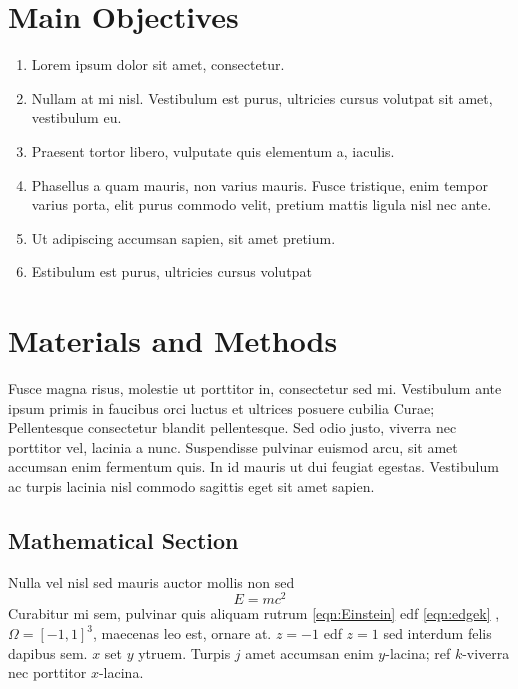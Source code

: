 \documentclass[12pt,a4paper]{article}\def\nCols{1}
\begin{document}
\section{Main Objectives}

\begin{enumerate}
\item Lorem ipsum dolor sit amet, consectetur.
\item Nullam at mi nisl. Vestibulum est purus, ultricies cursus volutpat sit amet, vestibulum eu.
\item Praesent tortor libero, vulputate quis elementum a, iaculis.
\item Phasellus a quam mauris, non varius mauris. Fusce tristique, enim tempor varius porta, elit purus commodo velit, pretium mattis ligula nisl nec ante.
\item Ut adipiscing accumsan sapien, sit amet pretium.
\item Estibulum est purus, ultricies cursus volutpat
\end{enumerate}








\section{Materials and Methods}

Fusce magna risus, molestie ut porttitor in, consectetur sed mi. Vestibulum ante ipsum primis in faucibus orci luctus et ultrices posuere cubilia Curae; Pellentesque consectetur blandit pellentesque. Sed odio justo, viverra nec porttitor vel, lacinia a nunc. Suspendisse pulvinar euismod arcu, sit amet accumsan enim fermentum quis. In id mauris ut dui feugiat egestas. Vestibulum ac turpis lacinia nisl commodo sagittis eget sit amet sapien.




\subsection{Mathematical Section}

Nulla vel nisl sed mauris auctor mollis non sed \cite{Smith:2012qr}
\begin{equation}
E = mc^{2}
\label{eqn:Einstein}
\end{equation}
Curabitur mi sem, pulvinar quis aliquam rutrum \eqref{eqn:Einstein} edf \eqref{eqn:edgek}
, $\Omega=[-1,1]^3$, maecenas leo est, ornare at. $z=-1$ edf $z=1$ sed interdum felis dapibus sem. $x$ set $y$ ytruem. 
Turpis $j$ amet accumsan enim $y$-lacina; 
ref $k$-viverra nec porttitor $x$-lacina. 
\end{document}
